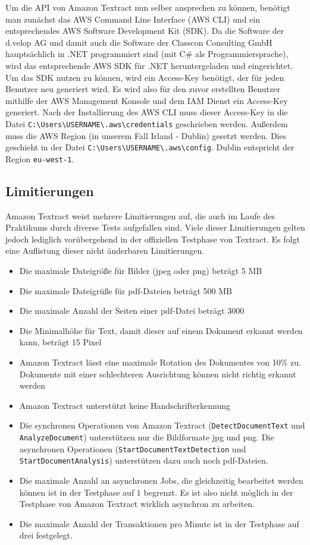 \documentclass{whswinvcbook}
\begin{document}
Um die API von Amazon Textract nun selber ansprechen zu können, benötigt man zunächst das AWS Command Line Interface (AWS CLI) und ein entsprechendes AWS Software Development Kit (SDK). Da die Software der d.velop AG und damit auch die Software der Classcon Consulting GmbH hauptsächlich in .NET programmiert sind (mit C\# als Programmiersprache), wird das entsprechende AWS SDK für .NET heruntergeladen und eingerichtet. Um das SDK nutzen zu können, wird ein Access-Key benötigt, der für jeden Benutzer neu generiert wird. Es wird also für den zuvor erstellten Benutzer mithilfe der AWS Management Konsole und dem IAM Dienst ein Access-Key generiert. Nach der Installierung des AWS CLI muss dieser Access-Key in die Datei \texttt{C:\textbackslash Users\textbackslash USERNAME\textbackslash .aws\textbackslash credentials} geschrieben werden. Außerdem muss die AWS Region (in unserem Fall Irland - Dublin) gesetzt werden. Dies geschieht in der Datei \texttt{C:\textbackslash Users\textbackslash USERNAME\textbackslash .aws\textbackslash config}. Dublin entspricht der Region \texttt{eu-west-1}.
\subsection{Limitierungen}
Amazon Textract weist mehrere Limitierungen auf, die auch im Laufe des Praktikums durch diverse Tests aufgefallen sind. Viele dieser Limitierungen gelten jedoch lediglich vorübergehend in der offiziellen Testphase von Textract. Es folgt eine Auflistung dieser nicht änderbaren Limitierungen.
\begin{itemize}
    \item Die maximale Dateigröße für Bilder (jpeg oder png) beträgt 5 MB
    \item Die maximale Dateigrüße für pdf-Dateien beträgt 500 MB
    \item Die maximale Anzahl der Seiten einer pdf-Datei beträgt 3000
    \item Die Minimalhöhe für Text, damit dieser auf einem Dokument erkannt werden kann, beträgt 15 Pixel
    \item Amazon Textract lässt eine maximale Rotation des Dokumentes von 10\% zu. Dokumente mit einer schlechteren Ausrichtung können nicht richtig erkannt werden
    \item Amazon Textract unterstützt keine Handschrifterkennung
    \item Die synchronen Operationen von Amazon Textract (\texttt{DetectDocumentText} und \texttt{AnalyzeDocument}) unterstützen nur die Bildformate jpg und png. Die asynchronen Operationen (\texttt{StartDocumentTextDetection} und \texttt{StartDocumentAnalysis}) unterstützen dazu auch noch pdf-Dateien.
    \item Die maximale Anzahl an asynchronen Jobs, die gleichzeitig bearbeitet werden können ist in der Testphase auf $1$ begrenzt. Es ist also nicht möglich in der Testphase von Amazon Textract wirklich asynchron zu arbeiten.
    \item Die maximale Anzahl der Transaktionen pro Minute ist in der Testphase auf drei festgelegt.
\end{itemize}
\end{document}
